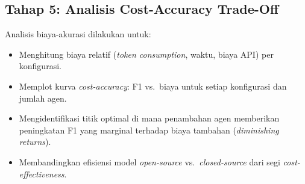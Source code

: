 \subsection{Tahap 5: Analisis Cost-Accuracy Trade-Off}

Analisis biaya-akurasi dilakukan untuk:
\begin{itemize}
	\item Menghitung biaya relatif (\textit{token consumption}, waktu, biaya API) per konfigurasi.
	\item Memplot kurva \textit{cost-accuracy}: F1 vs.\ biaya untuk setiap konfigurasi dan jumlah agen.
	\item Mengidentifikasi titik optimal di mana penambahan agen memberikan peningkatan F1 yang marginal terhadap biaya tambahan (\textit{diminishing returns}).
	\item Membandingkan efisiensi model \textit{open-source} vs.\ \textit{closed-source} dari segi \textit{cost-effectiveness}.
\end{itemize}

